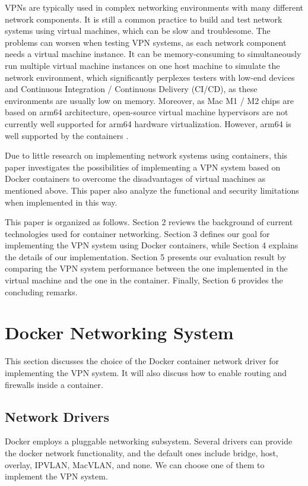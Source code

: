 \documentclass[article]{aaltoseries}
\begin{document}
VPNs are typically used in complex networking environments with many different network components. It is still a common practice \cite{9151942} to build and test network systems using virtual machines, which can be slow and troublesome. The problems can worsen when testing VPN systems, as each network component needs a virtual machine instance. It can be memory-consuming to simultaneously run multiple virtual machine instances on one host machine to simulate the network environment, which significantly perplexes testers with low-end devices and Continuous Integration / Continuous Delivery (CI/CD), as these environments are usually low on memory. Moreover, as Mac M1 / M2 chips are based on arm64 architecture, open-source virtual machine hypervisors are not currently well supported for arm64 hardware virtualization. However, arm64 is well supported by the containers \cite{9852232}.

Due to little research on implementing network systems using containers, this paper investigates the possibilities of implementing a VPN system based on Docker containers to overcome the disadvantages of virtual machines as mentioned above. This paper also analyze the functional and security limitations when implemented in this way.

This paper is organized as follows. Section 2 reviews the background of current technologies used for container networking. Section 3 defines our goal for implementing the VPN system using Docker containers, while Section 4 explains the details of our implementation. Section 5 presents our evaluation result by comparing the VPN system performance between the one implemented in the virtual machine and the one in the container. Finally, Section 6 provides the concluding remarks.



\section{Docker Networking System}
This section discusses the choice of the Docker container network driver for implementing the VPN system. It will also discuss how to enable routing and firewalls inside a container.

\subsection{Network Drivers}
Docker employs a pluggable networking subsystem. Several drivers can provide the docker network functionality, and the default ones include bridge, host, overlay, IPVLAN, MacVLAN, and none. We can choose one of them to implement the VPN system.
\end{document}
